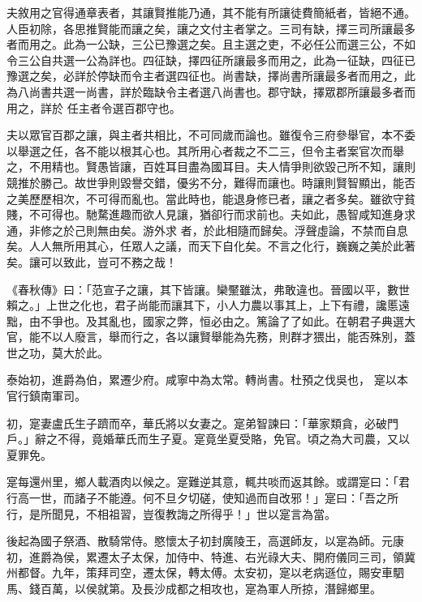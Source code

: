 \begin{pinyinscope}
 夫敘用之官得通章表者，其讓賢推能乃通，其不能有所讓徒費簡紙者，皆絕不通。人臣初除，各思推賢能而讓之矣，讓之文付主者掌之。三司有缺，擇三司所讓最多者而用之。此為一公缺，三公已豫選之矣。且主選之吏，不必任公而選三公，不如令三公自共選一公為詳也。四征缺，擇四征所讓最多而用之，此為一征缺，四征已豫選之矣，必詳於停缺而令主者選四征也。尚書缺，擇尚書所讓最多者而用之，此為八尚書共選一尚書，詳於臨缺令主者選八尚書也。郡守缺，擇眾郡所讓最多者而用之，詳於
 任主者令選百郡守也。



 夫以眾官百郡之讓，與主者共相比，不可同歲而論也。雖復令三府參舉官，本不委以舉選之任，各不能以根其心也。其所用心者裁之不二三，但令主者案官次而舉之，不用精也。賢愚皆讓，百姓耳目盡為國耳目。夫人情爭則欲毀己所不知，讓則競推於勝己。故世爭則毀譽交錯，優劣不分，難得而讓也。時讓則賢智顯出，能否之美歷歷相次，不可得而亂也。當此時也，能退身修已者，讓之者多矣。雖欲守貧賤，不可得也。馳騖進趣而欲人見讓，猶卻行而求前也。夫如此，愚智咸知進身求通，非修之於己則無由矣。游外求
 者，於此相隨而歸矣。浮聲虛論，不禁而自息矣。人人無所用其心，任眾人之議，而天下自化矣。不言之化行，巍巍之美於此著矣。讓可以致此，豈可不務之哉！



 《春秋傳》曰：「范宣子之讓，其下皆讓。欒黶雖汰，弗敢違也。晉國以平，數世賴之。」上世之化也，君子尚能而讓其下，小人力農以事其上，上下有禮，讒慝遠黜，由不爭也。及其亂也，國家之弊，恒必由之。篤論了了如此。在朝君子典選大官，能不以人廢言，舉而行之，各以讓賢舉能為先務，則群才猥出，能否殊別，蓋世之功，莫大於此。



 泰始初，進爵為伯，累遷少府。咸寧中為太常。轉尚書。杜預之伐吳也，
 寔以本官行鎮南軍司。



 初，寔妻盧氏生子躋而卒，華氏將以女妻之。寔弟智諫曰：「華家類貪，必破門戶。」辭之不得，竟婚華氏而生子夏。寔竟坐夏受賂，免官。頃之為大司農，又以夏罪免。



 寔每還州里，鄉人載酒肉以候之。寔難逆其意，輒共啖而返其餘。或謂寔曰：「君行高一世，而諸子不能遵。何不旦夕切磋，使知過而自改邪！」寔曰：「吾之所行，是所聞見，不相祖習，豈復教誨之所得乎！」世以寔言為當。



 後起為國子祭酒、散騎常侍。愍懷太子初封廣陵王，高選師友，以寔為師。元康初，進爵為侯，累遷太子太保，加侍中、特進、右光祿大夫、開府儀同三司，領冀
 州都督。九年，策拜司空，遷太保，轉太傅。太安初，寔以老病遜位，賜安車駟馬、錢百萬，以侯就第。及長沙成都之相攻也，寔為軍人所掠，潛歸鄉里。




\end{pinyinscope}
